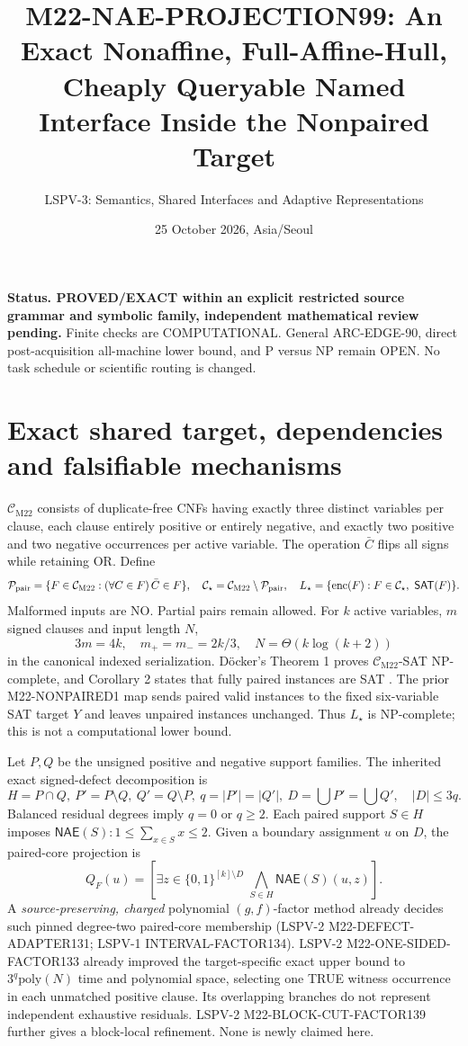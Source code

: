 \documentclass[11pt]{article}
\title{M22-NAE-PROJECTION99: An Exact Nonaffine, Full-Affine-Hull, Cheaply Queryable Named Interface Inside the Nonpaired Target}
\author{LSPV-3: Semantics, Shared Interfaces and Adaptive Representations}
\date{25 October 2026, Asia/Seoul}
\newcommand{\CM}{\mathcal C_{\mathrm{M22}}}
\newcommand{\CS}{\mathcal C_{\star}}
\newcommand{\SAT}{\mathsf{SAT}}
\newcommand{\NAE}{\mathsf{NAE}}
\begin{document}
\maketitle
\noindent\textbf{Status. PROVED/EXACT within an explicit restricted source grammar and symbolic family, independent mathematical review pending.} Finite checks are COMPUTATIONAL. General ARC-EDGE-90, direct post-acquisition all-machine lower bound, and P versus NP remain OPEN. No task schedule or scientific routing is changed.

\section{Exact shared target, dependencies and falsifiable mechanisms}
$\CM$ consists of duplicate-free CNFs having exactly three distinct variables per clause, each clause entirely positive or entirely negative, and exactly two positive and two negative occurrences per active variable. The operation $\bar C$ flips all signs while retaining OR. Define
\[
\mathcal P_{\rm pair}=\{F\in\CM:(\forall C\in F)\,\bar C\in F\},\quad
\CS=\CM\setminus\mathcal P_{\rm pair},\quad
L_\star=\{\mathrm{enc}(F):F\in\CS,\ \SAT(F)\}.
\]
Malformed inputs are NO. Partial pairs remain allowed. For $k$ active variables, $m$ signed clauses and input length $N$,
\[
3m=4k,\quad m_+=m_-=2k/3,\quad N=\Theta(k\log(k+2))
\]
in the canonical indexed serialization. D\"ocker's Theorem 1 proves $\CM$-SAT NP-complete, and Corollary 2 states that fully paired instances are SAT \cite{docker}. The prior M22-NONPAIRED1 map sends paired valid instances to the fixed six-variable SAT target $Y$ and leaves unpaired instances unchanged. Thus $L_\star$ is NP-complete; this is not a computational lower bound.

Let $P,Q$ be the unsigned positive and negative support families. The inherited exact signed-defect decomposition is
\[
H=P\cap Q,\ P'=P\setminus Q,\ Q'=Q\setminus P,\ 
q=|P'|=|Q'|,\ D=\bigcup P'=\bigcup Q',\quad |D|\le3q.
\]
Balanced residual degrees imply $q=0$ or $q\ge2$. Each paired support $S\in H$ imposes
$\NAE(S):1\le\sum_{x\in S}x\le2$. Given a boundary assignment $u$ on $D$, the paired-core projection is
\[
Q_F(u)=\left[\exists z\in\{0,1\}^{[k]\setminus D}\;
\bigwedge_{S\in H}\NAE(S)(u,z)\right].
\]
A \emph{source-preserving, charged} polynomial $(g,f)$-factor method already decides such pinned degree-two paired-core membership (LSPV-2 M22-DEFECT-ADAPTER131; LSPV-1 INTERVAL-FACTOR134). LSPV-2 M22-ONE-SIDED-FACTOR133 already improved the target-specific exact upper bound to $3^q\mathrm{poly}(N)$ time and polynomial space, selecting one TRUE witness occurrence in each unmatched positive clause. Its overlapping branches do not represent independent exhaustive residuals. LSPV-2 M22-BLOCK-CUT-FACTOR139 further gives a block-local refinement. None is newly claimed here.
\end{document}
